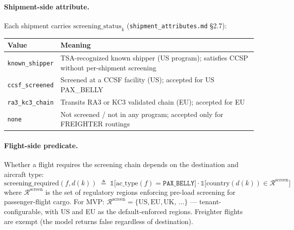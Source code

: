 \documentclass[11pt,a4paper]{article}
\newcommand{\defeq}{\triangleq}
\theoremstyle{definition}
\begin{document}
\paragraph{Shipment-side attribute.}
Each shipment carries $\text{screening\_status}_k$ (\texttt{shipment\_attributes.md}
\S2.7):
\begin{center}
\begin{tabular}{lp{9cm}}
\toprule
Value & Meaning \\
\midrule
\texttt{known\_shipper} & TSA-recognized known shipper (US program); satisfies CCSP without per-shipment screening \\
\texttt{ccsf\_screened} & Screened at a CCSF facility (US); accepted for US PAX\_BELLY \\
\texttt{ra3\_kc3\_chain} & Transits RA3 or KC3 validated chain (EU); accepted for EU \\
\texttt{none} & Not screened / not in any program; accepted only for FREIGHTER routings \\
\bottomrule
\end{tabular}
\end{center}

\paragraph{Flight-side predicate.}
Whether a flight requires the screening chain depends on the destination and aircraft
type:
\begin{equation}
  \text{screening\_required}(f, d(k)) \;\defeq\;
    \mathbb{1}\bigl[\text{ac\_type}(f) = \texttt{PAX\_BELLY}\bigr] \cdot
    \mathbb{1}\bigl[\text{country}(d(k)) \in \mathcal{R}^{\text{screen}}\bigr]
  \label{eq:screening-required}
\end{equation}
where $\mathcal{R}^{\text{screen}}$ is the set of regulatory regions enforcing pre-load
screening for passenger-flight cargo. For MVP: $\mathcal{R}^{\text{screen}} = \{\text{US}, \text{EU},
\text{UK},\, \ldots\}$ --- tenant-configurable, with US and EU as the default-enforced
regions. Freighter flights are exempt (the model returns false regardless of
destination).
\end{document}
